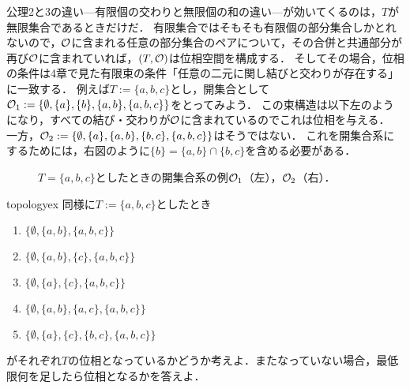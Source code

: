 \documentclass[11pt,a4paper, dvipdfmx]{jsarticle}
\begin{document}
公理2と3の違い---有限個の交わりと無限個の和の違い---が効いてくるのは，$T$が無限集合であるときだけだ．
有限集合ではそもそも有限個の部分集合しかとれないので，$\mathcal{O}$に含まれる任意の部分集合のペアについて，その合併と共通部分が再び$\mathcal{O}$に含まれていれば，$(T, \mathcal{O})$は位相空間を構成する．
そしてその場合，位相の条件は4章で見た有限束の条件「任意の二元に関し結びと交わりが存在する」に一致する．
例えば$T:=\{a, b, c\}$とし，開集合として$\mathcal{O}_1 := \{ \emptyset, \{a \}, \{b\}, \{a,b\}, \{a,b,c\} \}$をとってみよう．
この束構造は以下左のようになり，すべての結び・交わりが$\mathcal{O}$に含まれているのでこれは位相を与える．
一方，$\mathcal{O}_2 := \{ \emptyset, \{a \}, \{a,b\}, \{b,c\}, \{a,b,c\} \}$はそうではない．
これを開集合系にするためには，右図のように$\{b\} =  \{a,b\} \cap \{b,c\}$を含める必要がある．
\begin{figure}[h]
    \centering
    \caption{$T = \{a, b, c\}$としたときの開集合系の例$\mathcal{O}_1$（左），$\mathcal{O}_2$（右）．}
    \label{fig:3bool} 
\end{figure}


\begin{renshu}{}{topologyex}
同様に$T:=\{a, b, c\}$としたとき
\begin{enumerate}
\item $\{ \emptyset, \{a,b\}, \{a,b,c\} \}$
\item $\{ \emptyset, \{a,b\}, \{c\}, \{a,b,c\} \}$
\item $\{ \emptyset, \{a\}, \{c\}, \{a,b,c\} \}$
\item $\{ \emptyset, \{a,b\}, \{a,c\}, \{a,b,c\} \}$
\item $\{ \emptyset, \{a\}, \{c\}, \{b, c\}, \{a,b,c\} \}$
\end{enumerate}
がそれぞれ$T$の位相となっているかどうか考えよ．またなっていない場合，最低限何を足したら位相となるかを答えよ．
\end{renshu}
\end{document}
